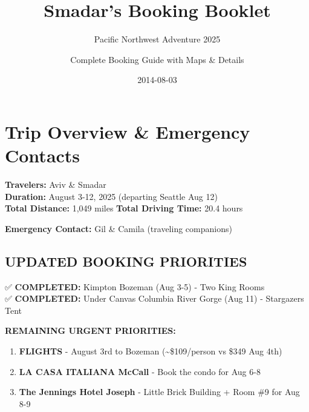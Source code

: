 \documentclass[
  10pt,
]{article}
\title{Smadar's Booking Booklet}
\subtitle{Pacific Northwest Adventure 2025}
\author{Complete Booking Guide with Maps \& Details}
\date{2014-08-03}
\begin{document}
\maketitle


\section{\texorpdfstring{\textcolor{primary}{Trip Overview \& Emergency Contacts}}{}}\label{section}

\vspace{0.5cm}

\textcolor{secondary}{\textbf{Travelers:}} Aviv \& Smadar\\
\textcolor{secondary}{\textbf{Duration:}} August 3-12, 2025 (departing
Seattle Aug 12)\\
\textcolor{secondary}{\textbf{Total Distance:}} 1,049 miles \textbar{}
\textcolor{secondary}{\textbf{Total Driving Time:}} 20.4 hours

\vspace{0.3cm}

\textcolor{primary}{\textbf{Emergency Contact:}} Gil \& Camila
(traveling companions)

\vspace{0.5cm}

\subsection{\texorpdfstring{\textcolor{primary}{UPDATED BOOKING PRIORITIES}}{}}\label{section-1}

\vspace{0.3cm}

✅ \textbf{\textcolor{primary}{COMPLETED:}} Kimpton Bozeman (Aug 3-5) -
Two King Rooms\\
✅ \textbf{\textcolor{primary}{COMPLETED:}} Under Canvas Columbia River
Gorge (Aug 11) - Stargazers Tent

\vspace{0.3cm}

\textcolor{secondary}{\textbf{REMAINING URGENT PRIORITIES:}}

\vspace{0.2cm}

\begin{enumerate}
\def\labelenumi{\arabic{enumi}.}
\item
  \textbf{\textcolor{primary}{FLIGHTS}} - August 3rd to Bozeman
  (\textasciitilde\$109/person vs \$349 Aug 4th)
\item
  \textbf{\textcolor{primary}{LA CASA ITALIANA McCall}} - Book the condo
  for Aug 6-8
\item
  \textbf{\textcolor{primary}{The Jennings Hotel Joseph}} - Little Brick
  Building + Room \#9 for Aug 8-9
\end{enumerate}
\end{document}
